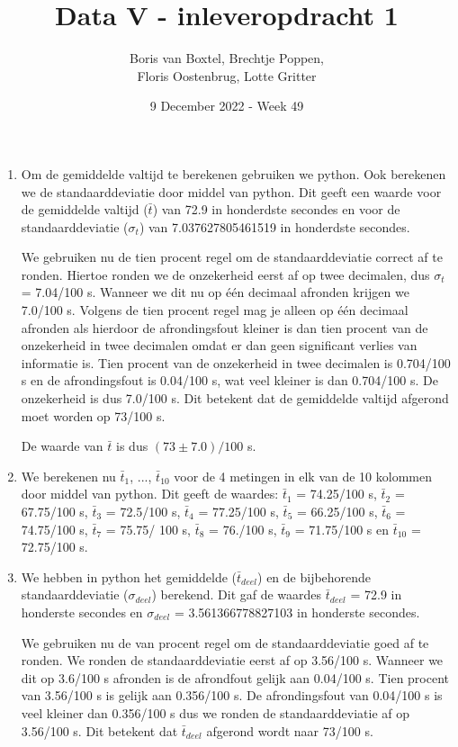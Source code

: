 \documentclass[12pt, dutch, a4paper]{article}
\title{Data V - inleveropdracht 1}
\author{Boris van Boxtel, Brechtje Poppen, \\  Floris Oostenbrug, Lotte Gritter}
\date{9 December 2022 - Week 49}
\theoremstyle{definition}
\begin{document}
\maketitle  
{} 

\begin{enumerate}[(a.)]
\item Om de gemiddelde valtijd te berekenen gebruiken we python. Ook berekenen we de standaarddeviatie door middel van python. Dit geeft een waarde voor de gemiddelde valtijd ($\bar t$) van 72.9 in honderdste secondes en voor de standaarddeviatie ($\sigma_t$) van 7.037627805461519 in honderdste secondes. 

We gebruiken nu de tien procent regel om de standaarddeviatie correct af te ronden. Hiertoe ronden we de onzekerheid eerst af op twee decimalen, dus $\sigma_t$ = 7.04/100 s. Wanneer we dit nu op één decimaal afronden krijgen we 7.0/100 s. Volgens de tien procent regel mag je alleen op één decimaal afronden als hierdoor de afrondingsfout kleiner is dan tien procent van de onzekerheid in twee decimalen omdat er dan geen significant verlies van informatie is. Tien procent van de onzekerheid in twee decimalen is 0.704/100 s en de afrondingsfout is 0.04/100 s, wat veel kleiner is dan 0.704/100 s. De onzekerheid is dus 7.0/100 s. Dit betekent dat de gemiddelde valtijd afgerond moet worden op 73/100 s. 

De waarde van $\bar t$ is dus $(73 \pm 7.0)/100$ s.

\item  We berekenen nu  $\bar t_1$, ...,  $\bar t_{10}$ voor de 4 metingen in elk van de 10 kolommen door middel van python. 
Dit geeft de waardes:
$\bar t_1$ = 74.25/100 s,
$\bar t_2$ = 67.75/100 s,
$\bar t_3$ = 72.5/100 s,
$\bar t_4$ = 77.25/100 s,
$\bar t_5$ = 66.25/100 s,
$\bar t_6$ = 74.75/100 s,
$\bar t_7$ = 75.75/ 100 s,
$\bar t_8$ = 76./100 s,
$\bar t_9$ = 71.75/100 s en
$\bar t_{10}$ = 72.75/100 s.
 
\item 
We hebben in python het gemiddelde ($\bar t_{deel}$) en de bijbehorende standaarddeviatie ($\sigma_{deel}$) berekend. Dit gaf de waardes $\bar t_{deel}$ = 72.9 in honderste secondes en $\sigma_{deel}$ = 3.561366778827103 in honderste secondes. 

We gebruiken nu de van procent regel om de standaarddeviatie goed af te ronden. We ronden de standaarddeviatie eerst af op 3.56/100 s. Wanneer we dit op 3.6/100 s afronden is de afrondfout gelijk aan 0.04/100 s. Tien procent van 3.56/100 s is gelijk aan 0.356/100 s. De afrondingsfout van 0.04/100 s is veel kleiner dan 0.356/100 s dus we ronden de standaarddeviatie af op 3.56/100 s. Dit betekent dat $\bar t_{deel}$ afgerond wordt naar 73/100 s. 


\end{enumerate}
\end{document}
